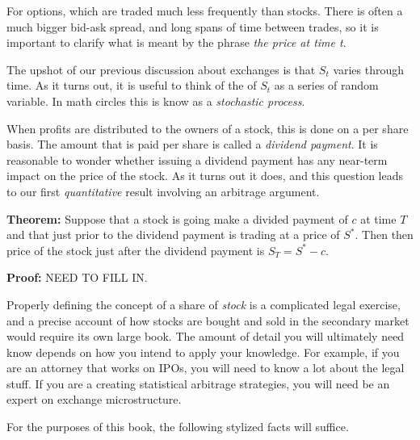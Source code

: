\documentclass[11pt,]{krantz}
\begin{document}
For options, which are traded much less frequently than stocks. There is often a much bigger bid-ask spread, and long spans of time between trades, so it is important to clarify what is meant by the phrase \emph{the price at time t}.

The upshot of our previous discussion about exchanges is that \(S_{t}\) varies through time. As it turns out, it is useful to think of the of \(S_{t}\) as a series of random variable. In math circles this is know as a \emph{stochastic process}.

When profits are distributed to the owners of a stock, this is done on a per share basis. The amount that is paid per share is called a \emph{dividend payment}. It is reasonable to wonder whether issuing a dividend payment has any near-term impact on the price of the stock. As it turns out it does, and this question leads to our first \emph{quantitative} result involving an arbitrage argument.

\textbf{Theorem:} Suppose that a stock is going make a divided payment of \(c\) at time \(T\) and that just prior to the dividend payment is trading at a price of \(S^{*}\). Then then price of the stock just after the dividend payment is \(S_{T} = S^{*} - c\).

\textbf{Proof:} NEED TO FILL IN.

Properly defining the concept of a share of \emph{stock} is a complicated legal exercise, and a precise account of how stocks are bought and sold in the secondary market would require its own large book. The amount of detail you will ultimately need know depends on how you intend to apply your knowledge. For example, if you are an attorney that works on IPOs, you will need to know a lot about the legal stuff. If you are a creating statistical arbitrage strategies, you will need be an expert on exchange microstructure.

For the purposes of this book, the following stylized facts will suffice.
\end{document}
